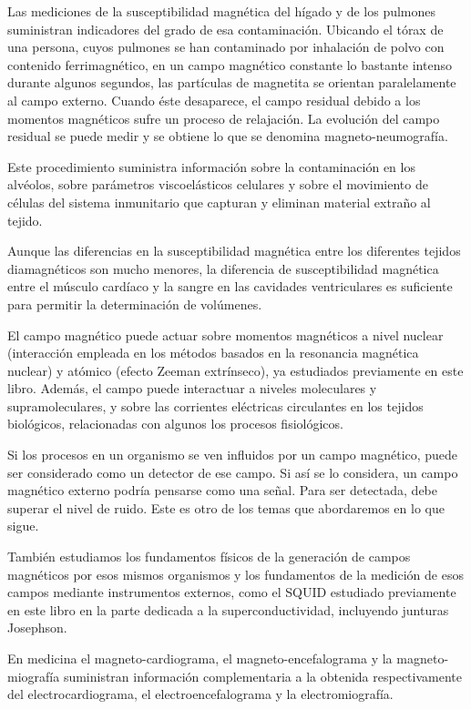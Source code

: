 Las mediciones de la susceptibilidad magnética del hígado y de los pulmones suministran indicadores del grado de esa contaminación. Ubicando el tórax de una persona, cuyos pulmones se han contaminado por inhalación de polvo con contenido ferrimagnético, en un campo magnético constante lo bastante intenso durante algunos segundos, las partículas de magnetita se orientan paralelamente al campo externo. Cuando éste desaparece, el campo residual debido a los momentos magnéticos sufre un proceso de relajación. La evolución del campo residual se puede medir y se obtiene lo que se denomina magneto-neumografía.

Este procedimiento suministra información sobre la contaminación en los alvéolos, sobre parámetros viscoelásticos celulares y sobre el movimiento de células del sistema inmunitario que capturan y eliminan material extraño al tejido.

Aunque las diferencias en la susceptibilidad magnética entre los diferentes tejidos diamagnéticos son mucho menores, la diferencia de susceptibilidad magnética entre el músculo cardíaco y la sangre en las cavidades ventriculares es suficiente para permitir la determinación de volúmenes.

El campo magnético puede actuar sobre momentos magnéticos a nivel nuclear (interacción empleada en los métodos basados en la resonancia magnética nuclear) y atómico (efecto Zeeman extrínseco), ya estudiados previamente en este libro. Además, el campo puede interactuar a niveles moleculares y supramoleculares, y sobre las corrientes eléctricas circulantes en los tejidos biológicos, relacionadas con algunos los procesos fisiológicos.

Si los procesos en un organismo se ven influidos por un campo magnético, puede ser considerado como un detector de ese campo. Si así se lo considera, un campo magnético externo podría pensarse como una señal. Para ser detectada, debe superar el nivel de ruido. Este es otro de los temas que abordaremos en lo que sigue.

También estudiamos los fundamentos físicos de la generación de campos magnéticos por esos mismos organismos y los fundamentos de la medición de esos campos mediante instrumentos externos, como el SQUID estudiado previamente en este libro en la parte dedicada a la superconductividad, incluyendo junturas Josephson.

En medicina el magneto-cardiograma, el magneto-encefalograma y la magneto-miografía suministran información complementaria a la obtenida respectivamente del electrocardiograma, el electroencefalograma y la electromiografía.

